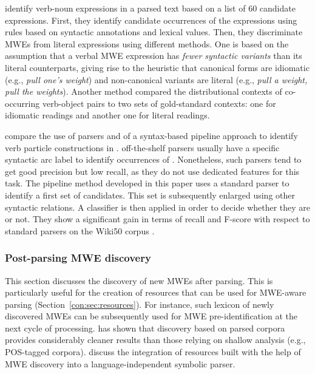 \documentclass[output=paper]{langsci/langscibook}
\begin{document}
\citet{fazly-cook-stevenson:2009:cl} identify verb-noun expressions in a parsed text based on a list of 60 candidate expressions. First, they identify candidate occurrences of the expressions using rules based on syntactic annotations and lexical values. Then, they discriminate  MWEs from literal expressions using different methods. One is based on the assumption that a verbal MWE expression has \emph{fewer syntactic variants} than its literal counterparts, giving rise to the heuristic that canonical forms are idiomatic (e.g., \textit{pull one's weight}) and non-canonical variants are literal (e.g., \textit{pull a weight, pull the weights}). Another method
compared the distributional contexts of co-occurring verb-object pairs to two sets of gold-standard contexts: one for idiomatic readings and another one for literal readings. 

\citet{nagyt-vincze:2014:mwe} compare the use of parsers and of a syntax-based pipeline approach to identify verb particle constructions in .  off-the-shelf parsers usually have a specific syntactic arc label to identify occurrences of . Nonetheless, such parsers tend to get good precision but low recall, as they do not use dedicated features for this task. The pipeline method developed in this paper  uses a standard parser to identify a first set of candidates. This set is subsequently enlarged using other syntactic relations. A classifier is then applied in order to decide whether they are  or not. They show a significant gain in terms of recall and F-score with respect to standard parsers on the Wiki50 corpus \citep{vincze11}.

\subsubsection{Post-parsing MWE discovery}
\label{con:ssec:discopost}
This section discusses the discovery of new MWEs after parsing. This is particularly useful for the creation of resources that can be used for MWE-aware parsing (Section~\ref{con:sec:resources}). 
For instance, such lexicon of newly discovered MWEs can be subsequently used for MWE pre-identification at the next cycle of processing.
\citet{seretan11} has shown that discovery based on parsed corpora provides considerably cleaner results than those relying on shallow analysis (e.g., POS-tagged corpora).  discuss the integration of resources built with the help of MWE discovery into a language-independent symbolic parser.
\end{document}
